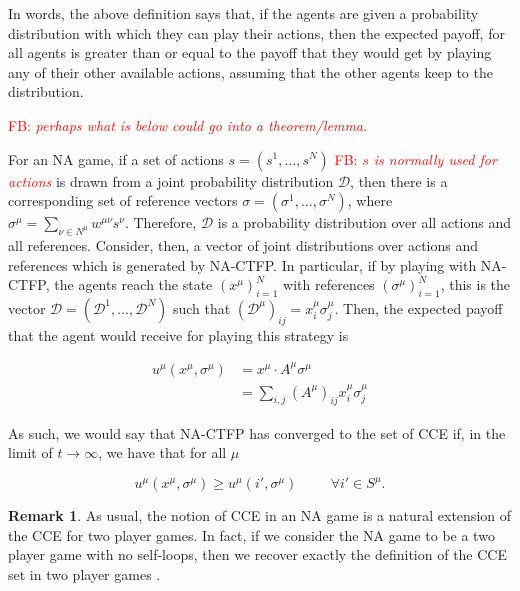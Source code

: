 \documentclass{article}
\theoremstyle{definition}
\newtheorem*{remark}{Remark}
\newcommand{\fb}[1]{\textcolor{red}{FB: \textit{#1}}}
\newcommand{\wmunu}{w^{\mu \nu}}
\newcommand{\xmu}{x^{\mu}}
\newcommand{\refmu}{\sigma^{\mu}}
\begin{document}
  In words, the above definition says that, if the agents are given a
  probability distribution with which they can play their actions, then
  the expected payoff, for all agents is greater than or equal to the
  payoff that they would get by playing any of their other available
  actions, assuming that the other agents keep to the distribution.

  \fb{perhaps what is below could go into a theorem/lemma.}
  
  For an NA game, if a set of actions $s = (s^1, \ldots, s^N)$ \fb{$s$ is normally used for actions} is
  drawn from a joint probability distribution $\mathcal{D}$, then
  there is a corresponding set of reference vectors $\sigma =
  (\sigma^1, \ldots, \sigma^N)$, where $\sigma^\mu = \sum_{\nu \in
    N^\mu} \wmunu s^\nu$.  Therefore, $\mathcal{D}$ is a probability
  distribution over all actions and all references.  Consider, then, a
  vector of joint distributions over actions and references which is
  generated by NA-CTFP. In particular, if by playing with NA-CTFP, the
  agents reach the state $(\xmu)_{i = 1}^N$ with references
  $(\refmu)_{i = 1}^N$, this is the vector $\mathcal{D} =
  (\mathcal{D}^1, ..., \mathcal{D}^N)$ such that
  $(\mathcal{D}^\mu)_{ij} = \xmu_i \refmu_j$. Then, the expected
  payoff that the agent would receive for playing this strategy is

  \begin{align}
    u^\mu(\xmu, \refmu) & = \xmu \cdot A^\mu \refmu \nonumber \\
    & = \sum_{i, j} (A^\mu)_{ij} \xmu_i \refmu_j \nonumber 
  \end{align}

  As such, we would say that NA-CTFP has converged to the set of CCE if, in the limit of $t
  \rightarrow \infty$, we have that for all $\mu$

  \begin{equation}
    u^\mu (\xmu, \refmu) \geq u^\mu(i', \refmu) \hspace{1cm} \forall i' \in S^\mu.
  \end{equation}

  \begin{remark}
    As usual, the notion of CCE in an NA game is a natural extension of the CCE for two player
    games. In fact, if we consider the NA game to be a two player game with no self-loops, then
    we recover exactly the definition of the CCE set in two player games \cite{PayoffPerformance}.
  \end{remark}
\end{document}
